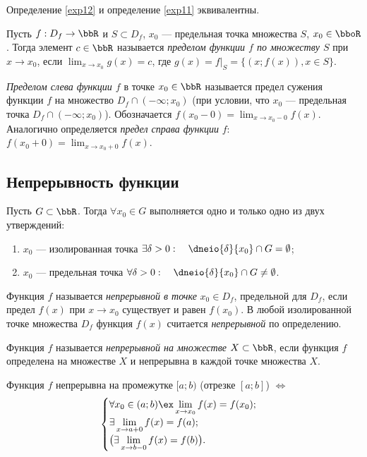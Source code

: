 \begin{thm}
Определение \ref{exp12} и определение \ref{exp11} эквивалентны.
\end{thm}

\begin{defn}
Пусть $f: D_f \to \bbR$ и $S \subset D_f$, $x_0$ --- предельная точка множества $S$, $x_0 \in \bboR$. Тогда элемент $c \in \bbR$ называется \textit{пределом функции $f$ по множеству $S$} при $x \to x_0$, если $\lim_{x \to x_0}\limits g(x) = c$, где $g(x)=\left.f\right|_S = \{(x;f(x)),x \in S\}$.
\end{defn}

\begin{defn}
\textit{Пределом слева функции $f$} в точке $x_0 \in \bbR$ называется предел сужения функции $f$ на множество $D_f \cap (-\infty;x_0)$ (при условии, что  $x_0$ --- предельная точка $D_f \cap (-\infty;x_0)$). Обозначается $f(x_0-0)=\lim_{x \to x_0-0}\limits f(x)$.
Аналогично определяется \textit{предел справа функции} $f$: $f(x_0+0)=\lim_{x \to x_0+0}\limits f(x)$. 
\end{defn}



\subsection{Непрерывность функции}
Пусть $G \subset \bbR$. Тогда $\forall x_0 \in G$ выполняется одно и только одно из двух утверждений:
\begin{enumerate}
\item $x_0$ --- изолированная точка $\exists \delta>0:\quad \dneio{\delta}{x_0} \cap G = \emptyset$;
\item $x_0$ --- предельная точка $\forall \delta > 0:\quad \dneio{\delta}{x_0}\cap G \neq \emptyset$.
\end{enumerate}

\begin{defn}
Функция $f$ называется \textit{непрерывной в точке} $x_0 \in D_f$, предельной для $D_f$, если предел $f(x)$ при $x \to x_0$ существует и равен $f(x_0)$. В любой изолированной точке множества $D_f$ функция $f(x)$ считается \textit{непрерывной} по определению. 
\end{defn}

\begin{defn}
Функция $f$ называется \textit{непрерывной на множестве} $X \subset \bbR$, если функция $f$ определена на множестве $X$ и непрерывна в каждой точке множества $X$. 
\end{defn}
\begin{lemm}
Функция $f$ непрерывна на промежутке $[a;b)$ \textup{(}отрезке $[a;b]$\textup{)} $\Longleftrightarrow$ 
$$
\begin{cases}
\forall x_0 \in (a;b) \ex \lim_{x \to x_0}\limits f(x) = f(x_0);\\
\exists \lim_{x \to a+0}\limits f(x) = f(a);\\
\bigr(\exists \lim_{x \to b-0}\limits f(x) = f(b)\bigl).\\
\end{cases}
$$  
\end{lemm}


